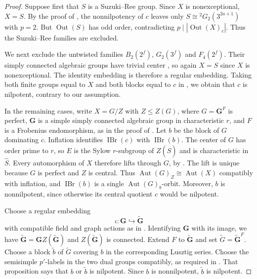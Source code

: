 \documentclass[11pt,a4paper]{article}
\theoremstyle{definition}
\theoremstyle{remark}
\numberwithin{equation}{section}
\DeclareMathOperator{\IBr}{IBr}
\DeclareMathOperator{\Aut}{Aut}
\DeclareMathOperator{\Out}{Out}
\begin{document}
\begin{proof}
		Suppose first that $S$ is a Suzuki--Ree group. Since $X$ is
		nonexceptional, $X=S$. By the proof of \cite[Lemma~4.4]{JiangZhangZhou2026},
		the nonnilpotency of $c$ leaves only $S\cong {}^2G_2(3^{2a+1})$
		with $p=2$. But $\Out(S)$ has odd order, contradicting
		$p\mid|\Out(X)_c|$. Thus the Suzuki--Ree families are excluded.
		
		We next exclude the untwisted families $B_2(2^f)$, $G_2(3^f)$
		and $F_4(2^f)$. Their simply connected algebraic groups have
		trivial center \cite[p.~3 of the arXiv version]{Johansson2022}, so again $X=S$ since $X$
		is nonexceptional. The identity embedding is therefore a regular
		embedding. Taking both finite groups equal to $X$ and both blocks
		equal to $c$ in \cite[Proposition~3.8]{JiangZhangZhou2026}, we obtain that $c$
		is nilpotent, contrary to our assumption.
		
		In the remaining cases, write $X=G/Z$ with $Z\leq Z(G)$,
		where $G=\mathbf G^F$ is perfect, $\mathbf G$ is a simple simply
		connected algebraic group in characteristic $r$, and $F$ is a
		Frobenius endomorphism, as in the proof of \cite[Proposition~4.2]{JiangZhangZhou2026}.
		Let $b$ be the block of $G$ dominating $c$. Inflation identifies
		$\IBr(c)$ with $\IBr(b)$. The center of $G$ has order prime to $r$,
		so $E$ is the Sylow $r$-subgroup of $Z(\widehat S)$ and is characteristic in $\widehat S$.
		Every automorphism of $X$ therefore lifts through $G$, by \cite[Corollary~B.8]{Navarro2018}.
		The lift is unique because $G$ is perfect and $Z$ is central.
		Thus $\Aut(G)_Z\cong\Aut(X)$ compatibly with inflation, and $\IBr(b)$ is a single
		$\Aut(G)_b$-orbit. Moreover, $b$ is nonnilpotent, since otherwise
		its central quotient $c$ would be nilpotent.
		
		Choose a regular embedding
		\[
		\iota:\mathbf G\hookrightarrow\widetilde{\mathbf G}
		\]
		with compatible field and graph actions as in
		\cite[pp.~873--874]{MalleSpath2016}. Identifying $\mathbf G$ with its image,
		we have $\widetilde{\mathbf G}=\mathbf G Z(\widetilde{\mathbf G})$
		and $Z(\widetilde{\mathbf G})$ is connected. Extend $F$ to
		$\widetilde{\mathbf G}$ and set $\widetilde G=\widetilde{\mathbf G}^{F}$.
		Choose a block $\widetilde b$ of $\widetilde G$ covering $b$ in
		the corresponding Lusztig series. Choose the semisimple $p'$-labels in the two dual groups
		compatibly, as required in \cite[Proposition~3.8]{JiangZhangZhou2026}.
		That proposition says that $b$ or $\widetilde b$ is nilpotent.
		Since $b$ is nonnilpotent, $\widetilde b$ is nilpotent.
		

\end{proof}
\end{document}
